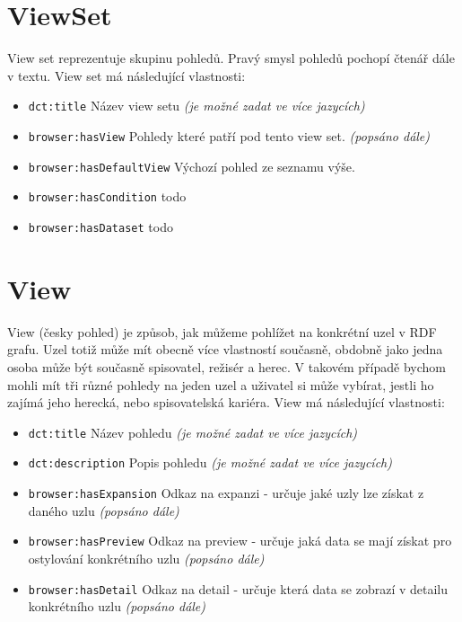 \section{ViewSet}
View set reprezentuje skupinu pohledů. Pravý smysl pohledů pochopí čtenář dále v textu. View set má následující vlastnosti:
\begin{itemize}
    \item \texttt{dct:title} Název view setu \textit{(je možné zadat ve více jazycích)}
    \item \texttt{browser:hasView} Pohledy které patří pod tento view set. \textit{(popsáno dále)}
    \item \texttt{browser:hasDefaultView} Výchozí pohled ze seznamu výše.
    \item \texttt{browser:hasCondition} todo
    \item \texttt{browser:hasDataset} todo
\end{itemize}

\section{View}
View (česky pohled) je způsob, jak můžeme pohlížet na konkrétní uzel v RDF grafu. Uzel totiž může mít obecně více vlastností současně, obdobně jako jedna osoba může být současně spisovatel, režisér a herec. V takovém případě bychom mohli mít tři různé pohledy na jeden uzel a uživatel si může vybírat, jestli ho zajímá jeho herecká, nebo spisovatelská kariéra. View má následující vlastnosti:

\begin{itemize}
    \item \texttt{dct:title} Název pohledu \textit{(je možné zadat ve více jazycích)}
    \item \texttt{dct:description} Popis pohledu \textit{(je možné zadat ve více jazycích)}
    \item \texttt{browser:hasExpansion} Odkaz na expanzi - určuje jaké uzly lze získat z daného uzlu \textit{(popsáno dále)}
    \item \texttt{browser:hasPreview} Odkaz na preview - určuje jaká data se mají získat pro ostylování konkrétního uzlu \textit{(popsáno dále)}
    \item \texttt{browser:hasDetail} Odkaz na detail - určuje která data se zobrazí v detailu konkrétního uzlu \textit{(popsáno dále)}
\end{itemize}

